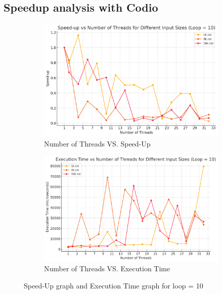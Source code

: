 \documentclass[letterpaper,12pt]{article}
\theoremstyle{remark}
\begin{document}
\subsection{Speedup analysis with Codio }
\begin{figure}[H]
    \centering
    \begin{subfigure}[t]{0.48\textwidth}  %
        \centering
        \includegraphics[width=\textwidth]{codioSleepLoop10.png}
        \caption{Number of Threads VS. Speed-Up}
        \label{fig:ThreadVsSpeedUp1}
    \end{subfigure}
    \hfill  %
    \begin{subfigure}[t]{0.48\textwidth}  %
        \centering
        \includegraphics[width=\textwidth]{codioExecutionTimeLoop10.png}
        \caption{Number of Threads VS. Execution Time}
        \label{fig:ThreadVsExecutionTime}
    \end{subfigure}
    \caption{Speed-Up graph and Execution Time graph for loop = 10}
    \label{fig:ThreadVsComparison}
\end{figure}
\hfill  %
\end{document}

